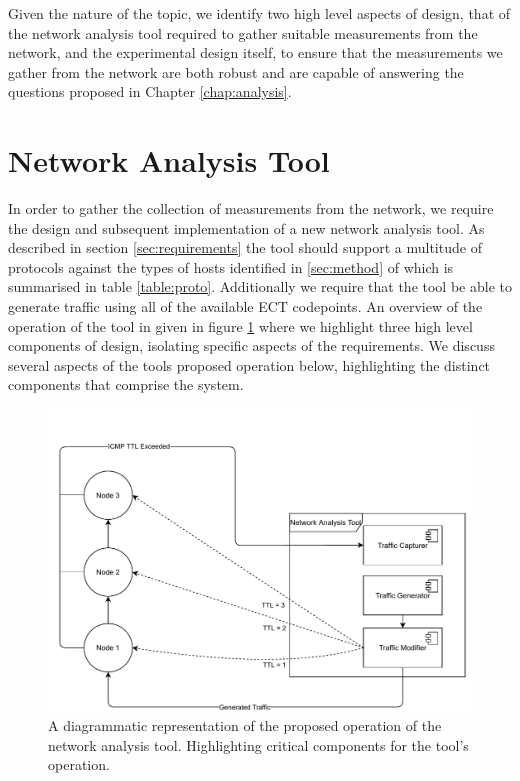 \documentclass{l4proj}
\begin{document}
Given the nature of the topic, we identify two high level aspects of design, that of the network analysis tool required to gather suitable measurements from the network, and the experimental design itself, to ensure that the measurements we gather from the network are both robust and are capable of answering the questions proposed in Chapter \ref{chap:analysis}.

\section{Network Analysis Tool}
\label{sec:tooldesign}

In order to gather the collection of measurements from the network, we require the design and subsequent implementation of a new network analysis tool. As described in section \ref{sec:requirements} the tool should support a multitude of protocols against the types of hosts identified in \ref{sec:method} of which is summarised in table \ref{table:proto}. Additionally we require that the tool be able to generate traffic using all of the available ECT codepoints. An overview of the operation of the tool in given in figure \ref{fig:tooldesign} where we highlight three high level components of design, isolating specific aspects of the requirements. We discuss several aspects of the tools proposed operation below, highlighting the distinct components that comprise the system.


\begin{figure}[H]
\centering
\includegraphics[width=14cm]{dissertation/images/sys_arch.pdf}
\caption{A diagrammatic representation of the proposed operation of the network analysis tool. Highlighting critical components for the tool's operation.}
\label{fig:tooldesign}
\end{figure}
\end{document}
